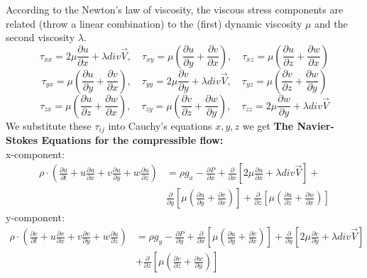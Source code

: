\documentclass[11pt]{report}
\newcommand{\bt}[1]{\textbf{#1}}
\newcommand{\NI}{\noindent}
\begin{document}
	\NI According to the Newton's law of viscosity, the viscous stress components are related (throw a linear combination) to the (first) dynamic viscosity $\mu$ and the second viscosity $\lambda$.
	\begin{equation}
		\tau_{xx} = 2\mu \frac{\partial u}{\partial x} + \lambda div\vec{V},\quad \tau_{xy} = \mu\left(\frac{\partial u}{\partial y}+\frac{\partial v}{\partial x}\right), \quad \tau_{xz} = \mu\left(\frac{\partial u}{\partial z} + \frac{\partial w}{\partial x}\right) \tag{i}\label{eq:2_t2_i}
	\end{equation}
	\begin{equation}
	\tau_{yx} = \mu\left(\frac{\partial u}{\partial y} + \frac{\partial v}{\partial x}\right),\quad \tau_{yy} = 2\mu\frac{\partial v}{\partial y} + \lambda div\vec{V},\quad \tau_{yz} = \mu\left(\frac{\partial v}{\partial z} + \frac{\partial w}{\partial y}\right) \tag{ii}\label{eq:2_t2_ii}
	\end{equation}
	\begin{equation}
		\tau_{zx} = \mu\left(\frac{\partial u}{\partial z} + \frac{\partial w}{\partial x}\right),\quad \tau_{zy} = \mu\left(\frac{\partial v}{\partial z} + \frac{\partial w}{\partial y}\right),\quad \tau_{zz} = 2\mu\frac{\partial w}{\partial y} + \lambda div\vec{V} \tag{iii}\label{eq:2_t2_iii}
	\end{equation}
	We substitute these $\tau_{ij}$ into Cauchy's equations $x,y,z$ we get \bt{The Navier-Stokes Equations for the compressible flow:}\\
	x-component:
	\begin{eqnarray*}
		\rho \cdot \left(\frac{\partial u}{\partial t} + u\frac{\partial u}{\partial x} + v\frac{\partial u}{\partial y} + w\frac{\partial u}{\partial z}\right) &= \rho g_x - \frac{\partial P}{\partial x} + \frac{\partial}{\partial x}\left[2\mu\frac{\partial u}{\partial x} + \lambda div\vec{V}\right] +\\
		 &\frac{\partial}{\partial y}\left[\mu\left(\frac{\partial u}{\partial y} + \frac{\partial v}{\partial x}\right)\right] + \frac{\partial}{\partial z}\left[\mu\left(\frac{\partial u}{\partial z} + \frac{\partial w}{\partial x}\right)\right] 
	\end{eqnarray*}
	y-component:
	\begin{eqnarray*}
		\rho \cdot \left(\frac{\partial v}{\partial t} + u\frac{\partial v}{\partial x} + v\frac{\partial v}{\partial y} + w\frac{\partial u}{\partial z}\right) &= \rho g_y - \frac{\partial P}{\partial y} + \frac{\partial}{\partial x}\left[\mu\left(\frac{\partial u}{\partial y} + \frac{\partial v}{\partial x}\right)\right] + \frac{\partial}{\partial y}\left[2\mu\frac{\partial v}{\partial y} + \lambda div \vec{V}\right] \\ 
		&+\frac{\partial}{\partial z}\left[\mu\left(\frac{\partial v}{\partial z} + \frac{\partial w}{\partial y}\right)\right] 
	\end{eqnarray*}
\end{document}
